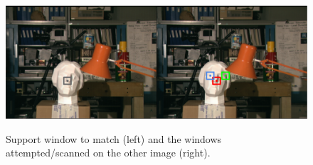 \begin{figure}[ht!]
\begin{center}
\includegraphics[height=0.40\textwidth]{fig/support_window}\\
\label{fig_support_window}
\caption{Support window to match (left) and the windows attempted/scanned on the other image (right).}
\end{center}
\end{figure}
